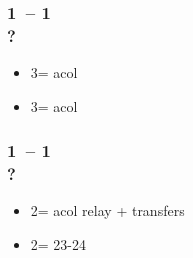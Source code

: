 \documentclass[12pt, a4paper]{report}
\begin{document}
\begin{bidpage}
\subsubsection*{1\clubs\ -- 1\spades\\
                ?}
\begin{itemize}
    \item 3\clubs = acol \diams
    \item 3\diams = acol \hearts
\end{itemize}
\end{bidpage}

\begin{bidpage}
\subsubsection*{1\clubs\ -- 1\nt\\
                ?}
\begin{itemize}
    \item 2\major = acol \major \then relay + transfers
    \item 2\nt = 23-24 \bal
\end{itemize}
\end{bidpage}
\end{document}
